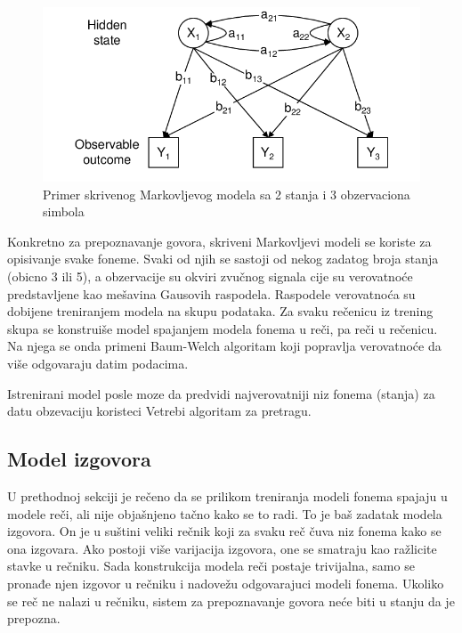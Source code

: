 \documentclass[a4paper]{article}
\begin{document}
\begin{figure}[h!]
  \begin{center}
    \includegraphics[scale=0.4]{hmm.png}
  \end{center}
  \caption{Primer skrivenog Markovljevog modela sa 2 stanja i 3 obzervaciona simbola}
  \label{fig:hmm}
\end{figure}

Konkretno za prepoznavanje govora, skriveni Markovljevi modeli se koriste za opisivanje svake foneme.
Svaki od njih se sastoji od nekog zadatog broja stanja (obicno 3 ili 5), a obzervacije su okviri zvučnog signala cije su verovatnoće predstavljene kao mešavina Gausovih raspodela.
Raspodele verovatnoća su dobijene treniranjem modela na skupu podataka.
Za svaku rečenicu iz trening skupa se konstruiše model spajanjem modela fonema u reči, pa reči u rečenicu.
Na njega se onda primeni Baum-Welch algoritam koji popravlja verovatnoće da više odgovaraju datim podacima.

Istrenirani model posle moze da predvidi najverovatniji niz fonema (stanja) za datu obzevaciju koristeci Vetrebi algoritam za pretragu.

\subsection{Model izgovora}
U prethodnoj sekciji je rečeno da se prilikom treniranja modeli fonema spajaju u modele reči, ali nije objašnjeno tačno kako se to radi.
To je baš zadatak modela izgovora.
On je u suštini veliki rečnik koji za svaku reč čuva niz fonema kako se ona izgovara.
Ako postoji više varijacija izgovora, one se smatraju kao ražlicite stavke u rečniku.
Sada konstrukcija modela reči postaje trivijalna, samo se pronađe njen izgovor u rečniku i nadovežu odgovarajuci modeli fonema.
Ukoliko se reč ne nalazi u rečniku, sistem za prepoznavanje govora neće biti u stanju da je prepozna.
\end{document}
